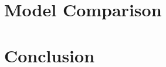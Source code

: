 \documentclass{llncs}
\begin{document}



\section{Model Comparison}




\section{Conclusion}






\end{document}

